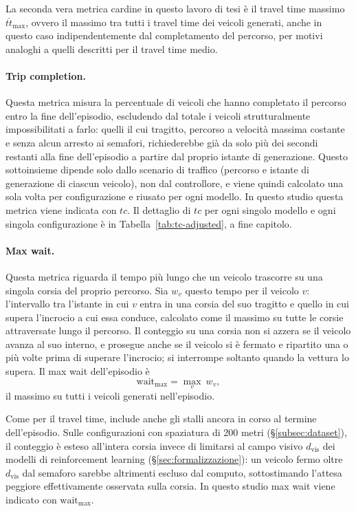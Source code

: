 La seconda vera metrica cardine in questo lavoro di tesi è il travel time massimo $\overline{tt}_{\max}$,
ovvero il massimo tra tutti i travel time dei veicoli generati, anche in questo caso indipendentemente
dal completamento del percorso, per motivi analoghi a quelli descritti per il travel time medio.

\paragraph{Trip completion.} Questa metrica misura la percentuale di veicoli che hanno completato il percorso entro la
fine dell'episodio, escludendo dal totale i veicoli strutturalmente impossibilitati a farlo: quelli il cui tragitto, percorso a velocità massima costante e senza alcun arresto ai semafori, richiederebbe già da solo più dei secondi restanti alla fine dell'episodio a partire dal proprio istante di generazione.
Questo sottoinsieme dipende solo dallo scenario di traffico (percorso e istante di generazione di ciascun veicolo), non dal controllore, e viene quindi calcolato una sola volta per configurazione e riusato per ogni modello.
In questo studio questa metrica viene indicata con $tc$. Il dettaglio di
$tc$ per ogni singolo modello e ogni singola configurazione è in
Tabella~\ref{tab:tc-adjusted}, a fine capitolo.

\paragraph{Max wait.} Questa metrica riguarda il tempo più lungo che un
veicolo trascorre su una singola corsia del proprio percorso. Sia $w_v$
questo tempo per il veicolo $v$: l'intervallo tra l'istante in cui $v$
entra in una corsia del suo tragitto e quello in cui supera l'incrocio a
cui essa conduce, calcolato come il massimo su tutte le corsie
attraversate lungo il percorso. Il conteggio su una corsia non si azzera
se il veicolo avanza al suo interno, e prosegue anche se il veicolo si è
fermato e ripartito una o più volte prima di superare l'incrocio; si
interrompe soltanto quando la vettura lo supera. Il max wait
dell'episodio è
\begin{equation}
  \text{wait}_{\max} = \max_{v}\ w_v ,
\end{equation}
il massimo su tutti i veicoli generati nell'episodio.

Come per il travel time, include anche gli stalli ancora in corso al
termine dell'episodio. Sulle configurazioni con spaziatura di 200 metri
(§\ref{subsec:dataset}), il conteggio è esteso all'intera corsia invece di
limitarsi al campo visivo $d_{\text{vis}}$ dei modelli di reinforcement
learning (§\ref{sec:formalizzazione}): un veicolo fermo oltre $d_{\text{vis}}$
dal semaforo sarebbe altrimenti escluso dal computo, sottostimando l'attesa
peggiore effettivamente osservata sulla corsia.
In questo studio max wait viene indicato con $\text{wait}_{\max}$.

